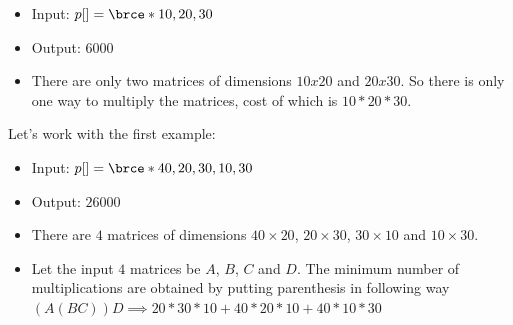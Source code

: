 \begin{itemize}[noitemsep,topsep=0pt]
\item Input: $p[]=\brce*{10,20,30}$
\item Output: $6000$
\item There are only two matrices of dimensions $10x20$ and $20x30$. So
  there is only one way to multiply the matrices, cost of which is
  $10*20*30$.
\end{itemize}

\textbf{}

\RayNotesBegin

Let's work with the first example:
\begin{itemize}[noitemsep,topsep=0pt]
\item Input: $p[]=\brce*{40,20,30,10,30}$
\item Output: $26000$
\item There are $4$ matrices of dimensions $40\times20$, $20\times30$,
  $30\times10$ and $10\times30$.
\item Let the input $4$ matrices be $A$, $B$, $C$ and $D$. The minimum
  number of multiplications are obtained by putting parenthesis in following
  way $(A(BC))D \implies 20*30*10 + 40*20*10 + 40*10*30$
\end{itemize}

